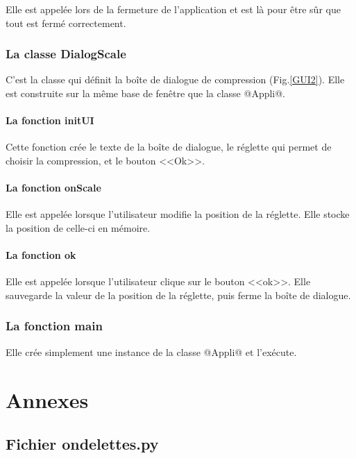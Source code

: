\documentclass{article}
\begin{document}
Elle est appelée lors de la fermeture de l'application et est là pour être sûr que tout est fermé correctement.



\subsubsection{La classe DialogScale}

C'est la classe qui définit la boîte de dialogue de compression (Fig.\ref{GUI2}). Elle est construite sur la même base de fenêtre que la classe @Appli@.

\paragraph{La fonction initUI}

Cette fonction crée le texte de la boîte de dialogue, le réglette qui permet de choisir la compression, et le bouton <<Ok>>.

\paragraph{La fonction onScale}

Elle est appelée lorsque l'utilisateur modifie la position de la réglette. Elle stocke la position de celle-ci en mémoire. 

\paragraph{La fonction ok}

Elle est appelée lorsque l'utilisateur clique sur le bouton <<ok>>. Elle sauvegarde la valeur de la position de la réglette, puis ferme la boîte de dialogue.

\subsubsection{La fonction main}

Elle crée simplement une instance de la classe @Appli@ et l'exécute.




\clearpage
\lstset{language=Python,frame=single,breaklines=true,extendedchars=true, numbers=left,basicstyle=\footnotesize}
\section{Annexes}

\subsection{Fichier ondelettes.py}

\end{document}
